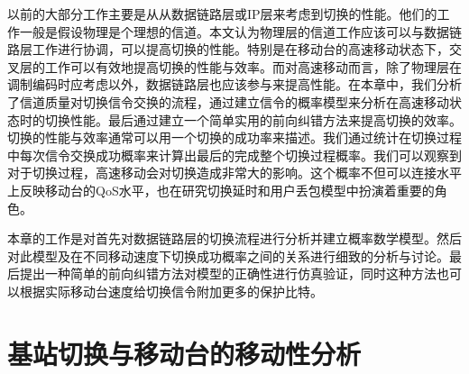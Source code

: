 以前的大部分工作主要是从从数据链路层或IP层来考虑到切换的性能。他们的工作一般是假设物理是个理想的信道。本文认为物理层的信道工作应该可以与数据链路层工作进行协调，可以提高切换的性能。特别是在移动台的高速移动状态下，交叉层的工作可以有效地提高切换的性能与效率。而对高速移动而言，除了物理层在调制编码时应考虑以外，数据链路层也应该参与来提高性能。在本章中，我们分析了信道质量对切换信令交换的流程，通过建立信令的概率模型来分析在高速移动状态时的切换性能。最后通过建立一个简单实用的前向纠错方法来提高切换的效率。切换的性能与效率通常可以用一个切换的成功率来描述。我们通过统计在切换过程中每次信令交换成功概率来计算出最后的完成整个切换过程概率。我们可以观察到对于切换过程，高速移动会对切换造成非常大的影响。这个概率不但可以连接水平上反映移动台的QoS水平，也在研究切换延时和用户丢包模型中扮演着重要的角色。

本章的工作是对首先对数据链路层的切换流程进行分析并建立概率数学模型。然后对此模型及在不同移动速度下切换成功概率之间的关系进行细致的分析与讨论。最后提出一种简单的前向纠错方法对模型的正确性进行仿真验证，同时这种方法也可以根据实际移动台速度给切换信令附加更多的保护比特。

\section{基站切换与移动台的移动性分析}
\label{section_iccs_handover_algorithm_mobility_analysis}
